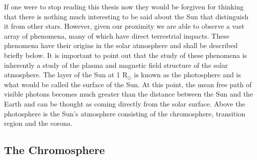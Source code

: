 If one were to stop reading this thesis now they would be forgiven for thinking that there is nothing much interesting to be said about the Sun that distinguish it from other stars. However, given our proximity we are able to observe a vast array of phenomena, many of which have direct terrestrial impacts. These phenomena have their origins in the solar atmosphere and shall be described briefly below. It is important to point out that the study of these phenomena is inherently a study of the plasma and magnetic field structure of the solar atmosphere.
The layer of the Sun at 1 R$_{\odot}$ is known as the photosphere and is what would be called the surface of the Sun. At this point, the mean free path of visible photons becomes much greater than the distance between the Sun and the Earth and can be thought as coming directly from the solar surface.
Above the photosphere is the Sun's atmosphere consisting of the chromosphere, transition region and the corona. 
\subsection{The Chromosphere}
